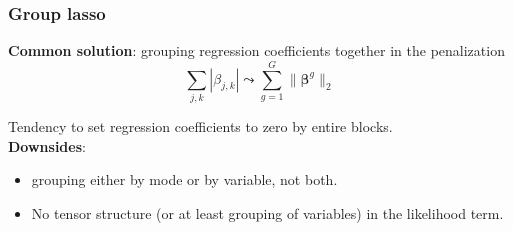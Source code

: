 \documentclass{beamer}
\begin{document}
\begin{frame}
    \frametitle{Group lasso}

 \textbf{Common solution}: grouping regression coefficients together in the penalization
 $$ \sum\limits_{j,k} |\beta_{j,k}|\leadsto \sum\limits_{g = 1}^G \lVert \bm{\beta}^g \rVert_2 $$

 Tendency to set regression coefficients to zero by entire blocks.\\[10 pt]

\textbf{Downsides}: 
\begin{itemize}
    \item grouping either by mode or by variable, not both.
    \item No tensor structure (or at least grouping of variables) in the likelihood term.\\[5 pt]
\end{itemize}
    

\end{frame}
\end{document}
